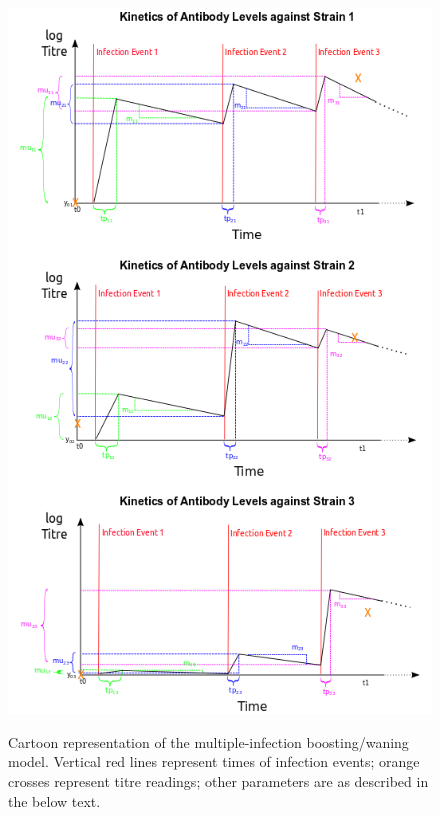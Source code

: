 \documentclass[a4paper,11pt,twoside]{article}
\begin{document}
\begin{figure}[h!]
\includegraphics[scale=0.7]{model_cartoon.png}\\
\caption{Cartoon representation of the multiple-infection boosting/waning model. Vertical red lines represent times of infection events; orange crosses represent titre readings; other parameters are as described in the below text.}
\end{figure}
\end{document}
